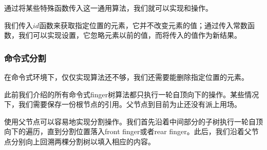 \documentclass[UTF8]{article}
\begin{document}
通过将某些特殊函数传入这一通用算法，我们就可以实现和操作。

\begin{algorithmic}
  \State \Return {}
\EndFunction
\Statex
{}
  \State \Return {}
\EndFunction
\end{algorithmic}

我们传入$id$函数来获取指定位置的元素，它并不改变元素的值；通过传入常数函数，我们可以实现设置，它忽略元素以前的值，而将传入的值作为新结果。

\subsubsection{命令式分割}

在命令式环境下，仅仅实现算法还不够，我们还需要能删除指定位置的元素。

此前我们介绍的所有命令式finger树算法都只执行一轮自顶向下的操作。某些情况下，我们需要保存一份根节点的引用。父节点到目前为止还没有派上用场。

使用父节点可以容易地实现分割操作。我们首先沿着中间部分的子树执行一轮自顶向下的遍历，直到分割位置落入front finger或者rear finger。此后，我们沿着父节点分别向上回溯两棵分割树以填入相应的内容。
\end{document}

